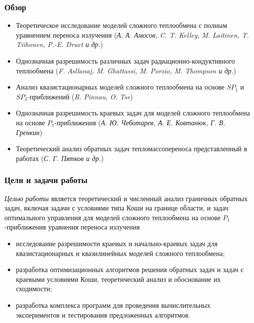 \begin{frame}
    \frametitle{Обзор}
    \begin{itemize}
        \item Теоретическое исследование моделей сложного теплообмена с
        полным уравнением переноса излучения
        (\textit{А. А. Амосов, C. T. Kelley, M. Laitinen, T. Tiihonen, P.-E. Druet и др.})
        \item Однозначная разрешимость различных задач радиационно-кондуктивного теплообмена
        (\textit{F. Asllanaj, M. Ghattassi, M. Porzio, M. Thompson и др.})
        \item Анализ квазистационарных моделей сложного теплообмена на основе $SP_1$ и $SP_3$-приближений
        (\textit{R. Pinnau, O. Tse})
        \item Однозначная разрешимость краевых задач для моделей сложного теплообмена на основе $P_1$-приближения
        (\textit{А. Ю. Чеботарев, А. Е. Ковтанюк, Г. В. Гренкин})
        \item Теоретический анализ обратных задач тепломассопереноса представленный в работах
        (\textit{С. Г. Пятков и др.})
    \end{itemize}
\end{frame}

\begin{frame}
    \frametitle{Цели и задачи работы}
    \textit{Целью работы} является теоретический и численный анализ граничных обратных задач, включая
    задачи с условиями типа Коши на границе области, и задач оптимального
    управления для моделей сложного теплообмена на основе $P_1$-приближения
    уравнения переноса излучения


    \begin{itemize}
        \item исследование разрешимости краевых и начально-краевых задач для
        квазистационарных и квазилинейных моделей сложного теплообмена;
        \item разработка оптимизационных алгоритмов решения обратных задач и
        задач с краевыми условиями Коши, теоретический анализ и обоснование их сходимости;
        \item разработка комплекса программ для проведения вычислительных
        экспериментов и тестирования предложенных алгоритмов.
    \end{itemize}
\end{frame}

